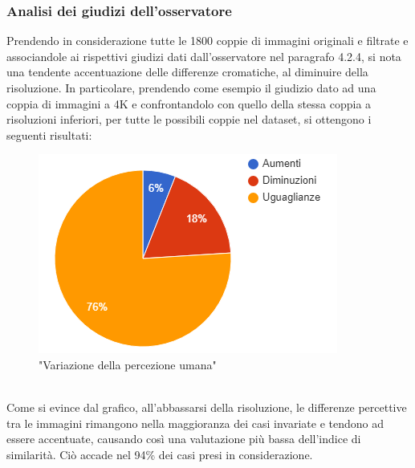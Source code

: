 \documentclass[a4paper,11pt]{article}
\begin{document}
    \subsubsection{Analisi dei giudizi dell'osservatore}
    Prendendo in considerazione tutte le 1800 coppie di immagini originali e filtrate e associandole ai rispettivi giudizi dati
    dall'osservatore nel paragrafo 4.2.4, si nota una tendente accentuazione delle differenze cromatiche, al diminuire della risoluzione.
    In particolare, prendendo come esempio il giudizio dato ad una coppia di immagini a 4K e confrontandolo con quello della stessa coppia a risoluzioni inferiori, per tutte le possibili coppie nel dataset,
    si ottengono i seguenti risultati:
    \begin{figure}[h]
        \centering
        \includegraphics{chart1}
        \caption{"Variazione della percezione umana"}
    \end{figure}
    \\Come si evince dal grafico, all'abbassarsi della risoluzione, le differenze percettive tra le immagini rimangono nella maggioranza dei casi invariate e tendono ad essere accentuate, causando così
    una valutazione più bassa dell'indice di similarità. Ciò accade nel 94\% dei casi presi in considerazione.
    \newpage
\end{document}
